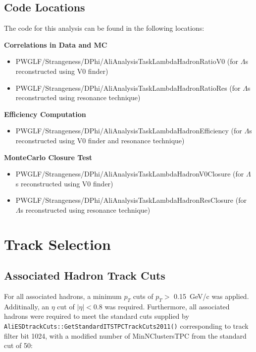 \documentclass[ALICE,manyauthors]{ALICE_analysis_notes}
\begin{document}
\begin{itemize}
\subsection{Code Locations}
The code for this analysis can be found in the following locations:

\textbf{Correlations in Data and MC}
\begin{itemize}
\item  PWGLF/Strangeness/DPhi/AliAnalysisTaskLambdaHadronRatioV0 (for $\Lambda$s reconstructed using V0 finder)
\item  PWGLF/Strangeness/DPhi/AliAnalysisTaskLambdaHadronRatioRes (for $\Lambda$s reconstructed using resonance technique)
\end{itemize}

\textbf{Efficiency Computation}
\begin{itemize}
\item  PWGLF/Strangeness/DPhi/AliAnalysisTaskLambdaHadronEfficiency (for $\Lambda$s reconstructed using V0 finder and resonance technique)
\end{itemize}

\textbf{MonteCarlo Closure Test}
\begin{itemize}
\item  PWGLF/Strangeness/DPhi/AliAnalysisTaskLambdaHadronV0Closure (for $\Lambda$s reconstructed using V0 finder)
\item  PWGLF/Strangeness/DPhi/AliAnalysisTaskLambdaHadronResClosure (for $\Lambda$s reconstructed using resonance technique)
\end{itemize}

\section{Track Selection}

\subsection{Associated Hadron Track Cuts}
\label{assoccuts}
For all associated hadrons, a minimum $p_{T}$ cuts of $p_{T} >$ \SI{0.15}{GeV/c} was applied.  Additinally, an $\eta$ cut of $|{\eta}| < 0.8$ was required. Furthermore, all associated hadrons were required to meet the standard cuts supplied by \texttt{AliESDtrackCuts::GetStandardITSTPCTrackCuts2011()} corresponding to track filter bit 1024, with a modified number of MinNClustersTPC from the standard cut of 50:


\end{itemize}
\end{document}

